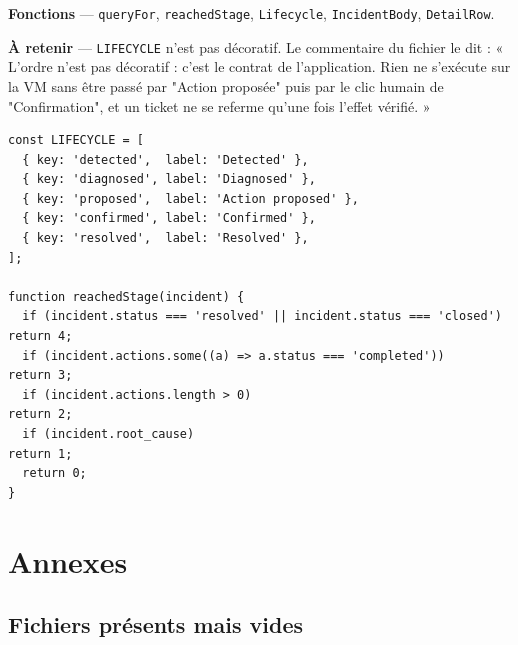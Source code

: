 \documentclass[11pt,a4paper]{report}
\newcommand{\fn}[1]{\texttt{\small\textcolor{oasisviolet}{#1}}}
\begin{document}
\textbf{Fonctions} --- \fn{queryFor}, \fn{reachedStage}, \fn{Lifecycle},
\fn{IncidentBody}, \fn{DetailRow}.

\textbf{À retenir} --- \texttt{LIFECYCLE} n'est pas décoratif. Le commentaire du
fichier le dit : « L'ordre n'est pas décoratif : c'est le contrat de
l'application. Rien ne s'exécute sur la VM sans être passé par "Action proposée"
puis par le clic humain de "Confirmation", et un ticket ne se referme qu'une
fois l'effet vérifié. »

\begin{lstlisting}[caption={Les cinq temps affichés, et la fonction qui calcule l'étape atteinte}]
const LIFECYCLE = [
  { key: 'detected',  label: 'Detected' },
  { key: 'diagnosed', label: 'Diagnosed' },
  { key: 'proposed',  label: 'Action proposed' },
  { key: 'confirmed', label: 'Confirmed' },
  { key: 'resolved',  label: 'Resolved' },
];

function reachedStage(incident) {
  if (incident.status === 'resolved' || incident.status === 'closed') return 4;
  if (incident.actions.some((a) => a.status === 'completed'))          return 3;
  if (incident.actions.length > 0)                                     return 2;
  if (incident.root_cause)                                             return 1;
  return 0;
}
\end{lstlisting}

\chapter{Annexes}

\section{Fichiers présents mais vides}
\end{document}

